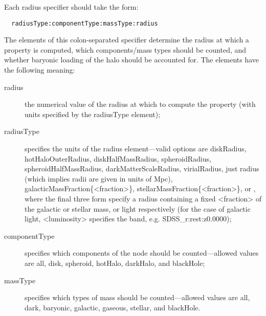 Each radius specifier should take the form:
\begin{verbatim}
  radiusType:componentType:massType:radius
\end{verbatim}
The elements of this colon-separated specifier determine the radius at which a property is computed, which components/mass types should be counted, and whether baryonic loading of the halo should be accounted for. The elements have the following meaning:
\begin{description}
 \item [{\normalfont \ttfamily radius}] the numerical value of the radius at which to compute the property (with units specified by the {\normalfont \ttfamily radiusType} element);
 \item [{\normalfont \ttfamily radiusType}] specifies the units of the {\normalfont \ttfamily radius} element---valid options are {\normalfont \ttfamily diskRadius}, {\normalfont \ttfamily hotHaloOuterRadius}, {\normalfont \ttfamily diskHalfMassRadius}, {\normalfont \ttfamily spheroidRadius}, {\normalfont \ttfamily spheroidHalfMassRadius}, {\normalfont \ttfamily darkMatterScaleRadius}, {\normalfont \ttfamily virialRadius}, just {\normalfont \ttfamily radius} (which implies radii are given in units of Mpc), {\normalfont \ttfamily galacticMassFraction\{\textless fraction\textgreater\}}, {\normalfont \ttfamily stellarMassFraction\{\textless fraction\textgreater\}}, or , where the final three form specify a radius containing a fixed {\normalfont \ttfamily \textless fraction\textgreater} of the galactic or stellar mass, or light respectively (for the case of galactic light, {\normalfont \ttfamily \textless luminosity\textgreater} specifies the band, e.g. {\normalfont \ttfamily SDSS\_r:rest:z0.0000});
 \item [{\normalfont \ttfamily componentType}] specifies which components of the node should be counted---allowed values are {\normalfont \ttfamily all}, {\normalfont \ttfamily disk}, {\normalfont \ttfamily spheroid}, {\normalfont \ttfamily hotHalo}, {\normalfont \ttfamily darkHalo}, and {\normalfont \ttfamily blackHole};
 \item [{\normalfont \ttfamily massType}] specifies which types of mass should be counted---allowed values are {\normalfont \ttfamily all}, {\normalfont \ttfamily dark}, {\normalfont \ttfamily baryonic}, {\normalfont \ttfamily galactic}, {\normalfont \ttfamily gaseous}, {\normalfont \ttfamily stellar}, and {\normalfont \ttfamily blackHole}.
\end{description}

